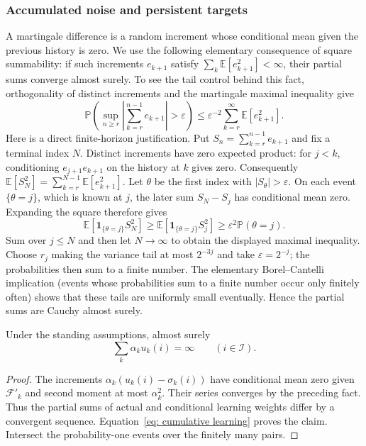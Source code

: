\subsubsection{Accumulated noise and persistent targets}\label{sec: replacement foundations}
A martingale difference is a random increment whose conditional mean given the previous history is zero. We use the following elementary consequence of square summability: if such increments $e_{k+1}$ satisfy $\sum_k\mathbb E[e_{k+1}^2]<\infty$, their partial sums converge almost surely. To see the tail control behind this fact, orthogonality of distinct increments and the martingale maximal inequality give
\[
\mathbb P\left(\sup_{n\ge r}\left|\sum_{k=r}^{n-1}e_{k+1}\right|>\varepsilon\right)
\le\varepsilon^{-2}\sum_{k=r}^\infty\mathbb E[e_{k+1}^2].
\]
Here is a direct finite-horizon justification. Put $S_n=\sum_{k=r}^{n-1}e_{k+1}$ and fix a terminal index $N$. Distinct increments have zero expected product: for $j<k$, conditioning $e_{j+1}e_{k+1}$ on the history at $k$ gives zero. Consequently $\mathbb E[S_N^2]=\sum_{k=r}^{N-1}\mathbb E[e_{k+1}^2]$. Let $\theta$ be the first index with $|S_\theta|>\varepsilon$. On each event $\{\theta=j\}$, which is known at $j$, the later sum $S_N-S_j$ has conditional mean zero. Expanding the square therefore gives
\[
\mathbb E[\mathbf1_{\{\theta=j\}}S_N^2]
\ge\mathbb E[\mathbf1_{\{\theta=j\}}S_j^2]
\ge\varepsilon^2\mathbb P(\theta=j).
\]
Sum over $j\le N$ and then let $N\to\infty$ to obtain the displayed maximal inequality. Choose $r_j$ making the variance tail at most $2^{-3j}$ and take $\varepsilon=2^{-j}$; the probabilities then sum to a finite number. The elementary Borel--Cantelli implication (events whose probabilities sum to a finite number occur only finitely often) shows that these tails are uniformly small eventually. Hence the partial sums are Cauchy almost surely.

\begin{lemma}\label{lem: actual learning}
Under the standing assumptions, almost surely
\[
\sum_k\alpha_k u_k(i)=\infty\qquad(i\in\mathcal I).
\]
\end{lemma}
\begin{proof}
The increments $\alpha_k(u_k(i)-\sigma_k(i))$ have conditional mean zero given $\mathcal F'_k$ and second moment at most $\alpha_k^2$. Their series converges by the preceding fact. Thus the partial sums of actual and conditional learning weights differ by a convergent sequence. Equation~\eqref{eq: cumulative learning} proves the claim. Intersect the probability-one events over the finitely many pairs.
\end{proof}

